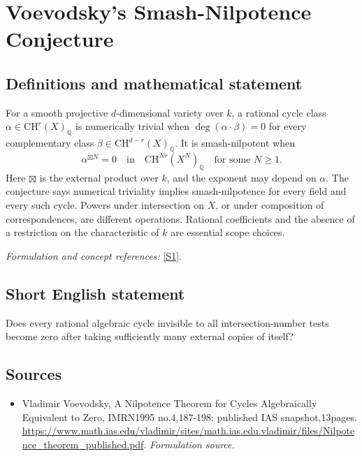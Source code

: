 \documentclass[11pt]{article}
\begin{document}
\section*{\texorpdfstring{Voevodsky's Smash-Nilpotence Conjecture}{Voevodsky's Smash-Nilpotence Conjecture}}\label{30006776}
\subsection{Definitions and mathematical statement}
For a smooth projective $d$-dimensional variety over $k$, a rational cycle class $\alpha\in\mathrm{CH}^r(X)_{{\mathbb{Q}}}$ is numerically trivial when
$\deg(\alpha\cdot\beta)=0$ for every complementary class $\beta\in\mathrm{CH}^{d-r}(X)_{{\mathbb{Q}}}$. It is smash-nilpotent when
\[
 \alpha^{\boxtimes N}=0\quad\text{in}\quad\mathrm{CH}^{Nr}(X^N)_{{\mathbb{Q}}}
 \quad\text{for some }N\ge1.
\]
Here $\boxtimes$ is the external product over $k$, and the exponent may depend on $\alpha$. The conjecture says numerical triviality implies smash-nilpotence for every field and every such cycle. Powers under intersection on $X$, or under composition of correspondences, are different operations. Rational coefficients and the absence of a restriction on the characteristic of $k$ are essential scope choices.
\par\smallskip\textit{Formulation and concept references:} \href{https://www.math.ias.edu/vladimir/sites/math.ias.edu.vladimir/files/Nilpotence_theorem_published.pdf}{[S1]}.

\subsection{Short English statement}
Does every rational algebraic cycle invisible to all intersection-number tests become zero after taking sufficiently many external copies of itself?
\subsection{Sources}
\begin{itemize}
\item[S1]Vladimir Voevodsky, A Nilpotence Theorem for Cycles Algebraically Equivalent to Zero, IMRN1995 no.4,187-198; published IAS snapshot,13pages.
\url{https://www.math.ias.edu/vladimir/sites/math.ias.edu.vladimir/files/Nilpotence_theorem_published.pdf}.
\textit{Formulation source.}
\end{itemize}
\end{document}
